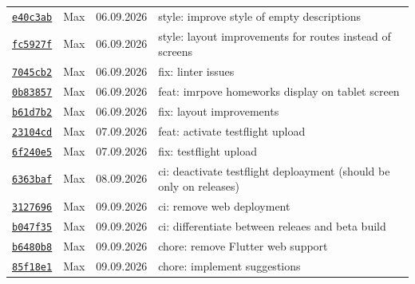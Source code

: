 \documentclass{article}%
\begin{document}
\begin{longtable}{l l l p{12cm}}
\href{https://github.com/scriptor1000/homeworks/pull/21/commits/e40c3ab1180d9f38beab3d07998ae4a2cc737532}{\underline{\texttt{e40c3ab}}}&Max&06.09.2026&style: improve style of empty descriptions\\%
\href{https://github.com/scriptor1000/homeworks/pull/21/commits/fc5927f6bd5a3e7164cb4745a9e265a966f4a658}{\underline{\texttt{fc5927f}}}&Max&06.09.2026&style: layout improvements for routes instead of screens\\%
\href{https://github.com/scriptor1000/homeworks/pull/21/commits/7045cb2993c9ef3827692bcecdca7ad2e35eb1dc}{\underline{\texttt{7045cb2}}}&Max&06.09.2026&fix: linter issues\\%
\href{https://github.com/scriptor1000/homeworks/pull/21/commits/0b83857798ba5e0868878a56f1291088bfb13b85}{\underline{\texttt{0b83857}}}&Max&06.09.2026&feat: imrpove homeworks display on tablet screen\\%
\href{https://github.com/scriptor1000/homeworks/pull/21/commits/b61d7b2bfceafb85811a43e900cdd6a881916bb0}{\underline{\texttt{b61d7b2}}}&Max&06.09.2026&fix: layout improvements\\%
\href{https://github.com/scriptor1000/homeworks/pull/21/commits/23104cd58f41975a64416f7f7bb23a0a8496b3f0}{\underline{\texttt{23104cd}}}&Max&07.09.2026&feat: activate testflight upload\\%
\href{https://github.com/scriptor1000/homeworks/pull/21/commits/6f240e5255175525560f0a3fc79a8ff059b0f2ca}{\underline{\texttt{6f240e5}}}&Max&07.09.2026&fix: testflight upload\\%
\href{https://github.com/scriptor1000/homeworks/pull/21/commits/6363baffa5932a01e0ad0a56c1e61983e4266fd7}{\underline{\texttt{6363baf}}}&Max&08.09.2026&ci: deactivate testflight deploayment (should be only on releases)\\%
\href{https://github.com/scriptor1000/homeworks/pull/21/commits/3127696804d73aae0f5c0fad35c00f75c1cbbd9f}{\underline{\texttt{3127696}}}&Max&09.09.2026&ci: remove web deployment\\%
\href{https://github.com/scriptor1000/homeworks/pull/21/commits/b047f359a081cf980f05ba222c9438c30a5f1f7a}{\underline{\texttt{b047f35}}}&Max&09.09.2026&ci: differentiate between releaes and beta build\\%
\href{https://github.com/scriptor1000/homeworks/pull/21/commits/b6480b8927f64716d8b23ef5ddd4a8765fa17483}{\underline{\texttt{b6480b8}}}&Max&09.09.2026&chore: remove Flutter web support\\%
\href{https://github.com/scriptor1000/homeworks/pull/21/commits/85f18e15d10474cb249be6cb257896b225fc2dc8}{\underline{\texttt{85f18e1}}}&Max&09.09.2026&chore: implement suggestions\\%

\end{longtable}
\end{document}
